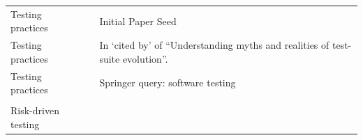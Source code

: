 \documentclass[]{book}
\begin{document}
\begin{longtable}[]{@{}lll@{}}
\begin{minipage}[t]{0.19\columnwidth}\raggedright\strut
Testing practices\strut
\end{minipage} & \begin{minipage}[t]{0.41\columnwidth}\raggedright\strut
\citet{beller2017developer}\strut
\end{minipage} & \begin{minipage}[t]{0.32\columnwidth}\raggedright\strut
Initial Paper Seed\strut
\end{minipage}\tabularnewline
\begin{minipage}[t]{0.19\columnwidth}\raggedright\strut
Testing practices\strut
\end{minipage} & \begin{minipage}[t]{0.41\columnwidth}\raggedright\strut
\citet{beller2015}\strut
\end{minipage} & \begin{minipage}[t]{0.32\columnwidth}\raggedright\strut
In `cited by' of ``Understanding myths and realities of test-suite
evolution''.\strut
\end{minipage}\tabularnewline
\begin{minipage}[t]{0.19\columnwidth}\raggedright\strut
Testing practices\strut
\end{minipage} & \begin{minipage}[t]{0.41\columnwidth}\raggedright\strut
\citet{moiz2017uncertainty}\strut
\end{minipage} & \begin{minipage}[t]{0.32\columnwidth}\raggedright\strut
Springer query: software testing\strut
\end{minipage}\tabularnewline
\begin{minipage}[t]{0.19\columnwidth}\raggedright\strut
\strut
\end{minipage} & \begin{minipage}[t]{0.41\columnwidth}\raggedright\strut
\strut
\end{minipage} & \begin{minipage}[t]{0.32\columnwidth}\raggedright\strut
\strut
\end{minipage}\tabularnewline
\begin{minipage}[t]{0.19\columnwidth}\raggedright\strut
Risk-driven testing\strut
\end{minipage} & \begin{minipage}[t]{0.41\columnwidth}\raggedright\strut
\citet{hemmati2018}\strut
\end{minipage} & \begin{minipage}[t]{0.32\columnwidth}\raggedright\strut

\end{minipage}
\end{longtable}
\end{document}

